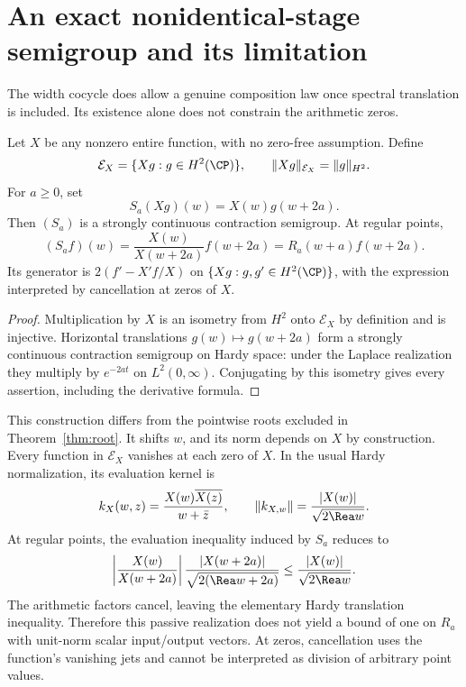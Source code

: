 \section{An exact nonidentical-stage semigroup and its limitation}
The width cocycle does allow a genuine composition law once spectral translation is included. Its existence alone does not constrain the arithmetic zeros.

\begin{proposition}\label{prop:weighted}
Let $X$ be any nonzero entire function, with no zero-free assumption. Define
\[
 \mathcal E_X=\{Xg:g\in H^2(\CP)\},\qquad \|Xg\|_{\mathcal E_X}=\|g\|_{H^2}.
\]
For $a\geq0$, set
\[
 S_a(Xg)(w)=X(w)g(w+2a).
\]
Then $(S_a)$ is a strongly continuous contraction semigroup. At regular points,
\[
 (S_af)(w)=\frac{X(w)}{X(w+2a)}f(w+2a)=R_a(w+a)f(w+2a).
\]
Its generator is $2(f'-X'f/X)$ on $\{Xg:g,g'\in H^2(\CP)\}$, with the expression interpreted by cancellation at zeros of $X$.
\end{proposition}
\begin{proof}
Multiplication by $X$ is an isometry from $H^2$ onto $\mathcal E_X$ by definition and is injective. Horizontal translations $g(w)\mapsto g(w+2a)$ form a strongly continuous contraction semigroup on Hardy space: under the Laplace realization they multiply by $e^{-2at}$ on $L^2(0,\infty)$. Conjugating by this isometry gives every assertion, including the derivative formula.
\end{proof}
This construction differs from the pointwise roots excluded in Theorem~\ref{thm:root}. It shifts $w$, and its norm depends on $X$ by construction. Every function in $\mathcal E_X$ vanishes at each zero of $X$. In the usual Hardy normalization, its evaluation kernel is
\[
 k_X(w,z)=\frac{X(w)\overline{X(z)}}{w+\bar z},\qquad
 \|k_{X,w}\|=\frac{|X(w)|}{\sqrt{2\Rea w}}.
\]
At regular points, the evaluation inequality induced by $S_a$ reduces to
\[
 \left|\frac{X(w)}{X(w+2a)}\right|
 \frac{|X(w+2a)|}{\sqrt{2(\Rea w+2a)}}
 \leq\frac{|X(w)|}{\sqrt{2\Rea w}}.
\]
The arithmetic factors cancel, leaving the elementary Hardy translation inequality. Therefore this passive realization does not yield a bound of one on $R_a$ with unit-norm scalar input/output vectors. At zeros, cancellation uses the function's vanishing jets and cannot be interpreted as division of arbitrary point values.

